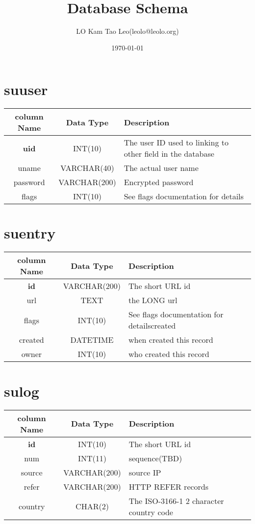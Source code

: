 \documentclass[a4paper,12pt,hidelinks]{article}
\title{Database Schema}
\author{LO Kam Tao Leo(leolo@leolo.org)}
\date{\today}
\begin{document}
\maketitle
\section{su\textunderscore user}
\begin{tabular}{c|c|p{9cm}}
column Name & Data Type &  Description \\ \hline
 \textbf{uid} & INT(10) & The user ID used to linking to other field in the database \\\hline
 uname & VARCHAR(40) &  The actual user name\\\hline
 password & VARCHAR(200) & Encrypted password\\\hline
 flags & INT(10) & See flags documentation for details
\end{tabular}\section{su\textunderscore entry}
\begin{tabular}{c|c|p{9cm}}
column Name & Data Type &  Description \\ \hline
 \textbf{id} & VARCHAR(200) & The short URL id \\\hline
 url & TEXT & the LONG url\\\hline
 flags & INT(10) & See flags documentation for detailscreated\\\hline
 created & DATETIME & when created this record \\\hline
 owner & INT(10) & who created this record 
\end{tabular}\section{su\textunderscore log}
\begin{tabular}{c|c|p{9cm}}
column Name & Data Type &  Description \\ \hline
 \textbf{id} & INT(10) & The short URL id \\\hline
 num & INT(11) & sequence(TBD)\\\hline
 source & VARCHAR(200) & source IP\\\hline
 refer & VARCHAR(200) & HTTP REFER records\\\hline
 country & CHAR(2) & The ISO-3166-1 2 character country code 
\end{tabular}
\end{document}
